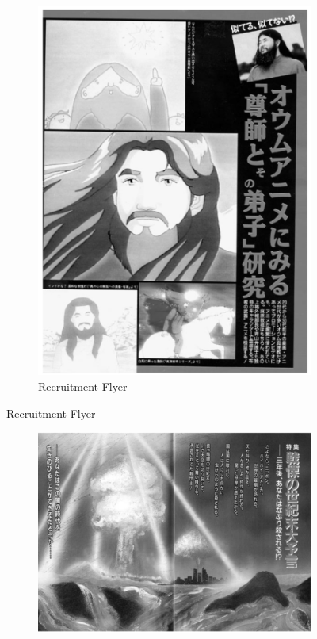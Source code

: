 \documentclass[12pt, letterpaper]{article}
\begin{document}
\begin{figure}[h]
\begin{subfigure}[b]{.4\linewidth}
    \includegraphics[width=\linewidth]{flyer.png}
    \caption{Recruitment Flyer}
  \end{subfigure}
\end{figure}


\begin{figure}[h]
  \caption{Harumagedon}
  \label{fig:harumagedon}
  \centering
  \begin{subfigure}[b]{.9\linewidth}
    \includegraphics[width=\linewidth]{harumagedon.png}
  \end{subfigure}
\end{figure}
\end{document}
